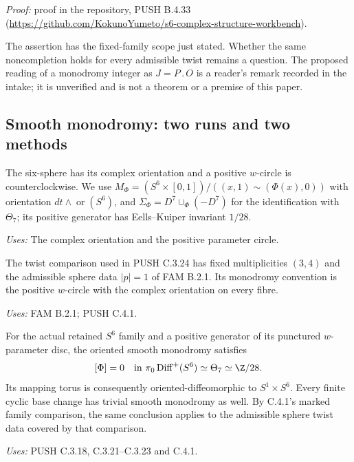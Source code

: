 \noindent\emph{Proof:} proof in the repository, PUSH B.4.33 (\url{https://github.com/KokunoYumeto/s6-complex-structure-workbench}).

The assertion has the fixed-family scope just stated. Whether the same
noncompletion holds for every admissible twist remains a question.
The proposed reading of a monodromy integer as $J=P\mathbin{.}O$ is a
reader's remark recorded in the intake; it is unverified and is not a
theorem or a premise of this paper.
\subsection{Smooth monodromy: two runs and two methods}
\begin{definition}\label{push:C.orientation}
The six-sphere has its complex orientation and a positive $w$-circle
is counterclockwise. We use
$M_\Phi=(S^6\times[0,1])/((x,1)\sim(\Phi(x),0))$ with orientation
$dt\wedge\operatorname{or}(S^6)$, and
$\Sigma_\Phi=D^7\cup_\Phi(-D^7)$ for the identification with
$\Theta_7$; its positive generator has Eells--Kuiper invariant $1/28$.
\end{definition}
\noindent\emph{Uses:} The complex orientation and the positive parameter circle.\par

\begin{definition}\label{push:C.4.1.scope}
The twist comparison used in PUSH C.3.24 has fixed multiplicities $(3,4)$ and the admissible sphere data $|p|=1$ of FAM B.2.1. Its monodromy convention is the positive $w$-circle with the complex orientation on every fibre.
\end{definition}
\noindent\emph{Uses:} FAM B.2.1; PUSH C.4.1.\par

\begin{announcement}[PUSH C.3.24; A]\label{push:C.3.24}
For the actual retained $S^6$ family and a positive generator
of its punctured $w$-parameter disc, the oriented smooth
monodromy satisfies
\[
 [\Phi]=0\quad\hbox{in }\pi_0\operatorname{Diff}^+(S^6)
                       \simeq\Theta_7\simeq\Z/28.
\]
Its mapping torus is consequently oriented-diffeomorphic to
$S^1\times S^6$. Every finite cyclic base change has trivial
smooth monodromy as well. By C.4.1's marked family comparison,
the same conclusion applies to the admissible sphere twist
data covered by that comparison.
\end{announcement}
\noindent\emph{Uses:} PUSH C.3.18, C.3.21--C.3.23 and C.4.1.\par

